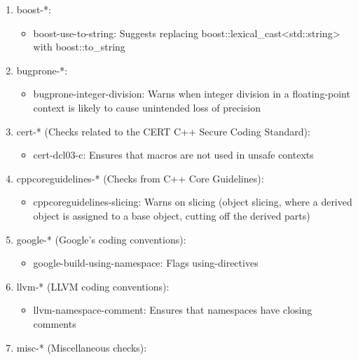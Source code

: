 \begin{enumerate}
\item
boost-*:

\begin{itemize}
\item
boost-use-to-string: Suggests replacing boost::lexical\_cast<std::string> with boost::to\_string
\end{itemize}

\item
bugprone-*:

\begin{itemize}
\item
bugprone-integer-division: Warns when integer division in a floating-point context is likely to cause unintended loss of precision
\end{itemize}

\item
cert-* (Checks related to the CERT C++ Secure Coding Standard):

\begin{itemize}
\item
cert-dcl03-c: Ensures that macros are not used in unsafe contexts
\end{itemize}

\item
cppcoreguidelines-* (Checks from C++ Core Guidelines):

\begin{itemize}
\item
cppcoreguidelines-slicing: Warns on slicing (object slicing, where a derived object is assigned to a base object, cutting off the derived parts)
\end{itemize}

\item
google-* (Google's coding conventions):

\begin{itemize}
\item
google-build-using-namespace: Flags using-directives
\end{itemize}

\item
llvm-* (LLVM coding conventions):

\begin{itemize}
\item
llvm-namespace-comment: Ensures that namespaces have closing comments
\end{itemize}

\item
misc-* (Miscellaneous checks):


\end{enumerate}
